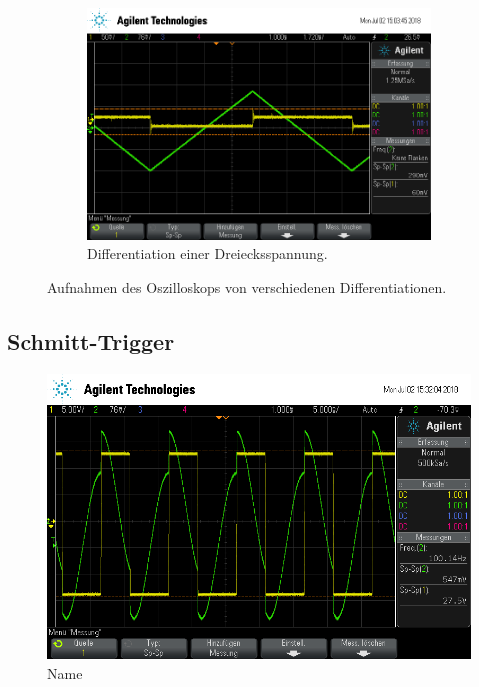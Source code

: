 \begin{figure}[ht]
\begin{subfigure}[]{\textwidth}
    \label{subfig:dif_rechteck}
  \end{subfigure}
  \begin{subfigure}[]{\textwidth}
    \centering
    \includegraphics[height=0.3\textheight]{data/scope_267.png}
    \caption{Differentiation einer Dreiecksspannung.}
    \label{subfig:dif_dreieck}
  \end{subfigure}
  \caption{Aufnahmen des Oszilloskops von verschiedenen Differentiationen.}
  \label{fig:integrationen}
\end{figure}

\subsection{Schmitt-Trigger}
\begin{figure}[ht]
  \centering
  \includegraphics[height=0.3\textheight]{data/scope_268.png}
  \caption{Name}
  \label{fig:schmitt}
\end{figure}

